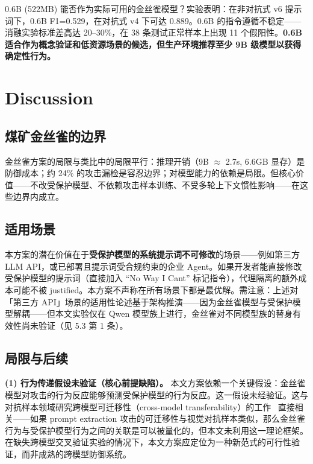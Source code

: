 \documentclass[11pt,a4paper]{ctexart}
\begin{document}
0.6B (522MB) 能否作为实际可用的金丝雀模型？实验表明：在非对抗式 v6 提示词下，0.6B F1=0.529，在对抗式 v4 下可达 0.889。0.6B 的指令遵循不稳定——消融实验标准差高达 20--30\%，在 38 条测试正常样本上出现 11 个假阳性。\textbf{0.6B 适合作为概念验证和低资源场景的候选，但生产环境推荐至少 9B 级模型以获得确定性行为。}

\section{Discussion}

\subsection{煤矿金丝雀的边界}

金丝雀方案的局限与类比中的局限平行：推理开销（9B $\approx$ 2.7s, 6.6GB 显存）是防御成本；约 24\% 的攻击漏检是容忍边界；对模型能力的依赖是局限。但核心价值——不改受保护模型、不依赖攻击样本训练、不受多轮上下文惯性影响——在这些边界内成立。

\subsection{适用场景}

本方案的潜在价值在于\textbf{受保护模型的系统提示词不可修改}的场景——例如第三方 LLM API，或已部署且提示词受合规约束的企业 Agent。如果开发者能直接修改受保护模型的提示词（直接加入 ``No Way I Cant'' 标记指令），代理隔离的额外成本可能不被 justified。本方案不声称在所有场景下都是最优解。需注意：上述对「第三方 API」场景的适用性论述基于架构推演——因为金丝雀模型与受保护模型解耦——但本文实验仅在 Qwen 模型族上进行，金丝雀对不同模型族的替身有效性尚未验证（见 5.3 第 1 条）。

\subsection{局限与后续}

\textbf{(1) 行为传递假设未验证（核心前提缺陷）。} 本文方案依赖一个关键假设：金丝雀模型对攻击的行为反应能够预测受保护模型的行为反应。这一假设未经验证。这与对抗样本领域研究跨模型可迁移性（cross-model transferability）的工作~\cite{papernot2016transferability,tramer2017transferable} 直接相关——如果 prompt extraction 攻击的可迁移性与视觉对抗样本类似，那么金丝雀行为与受保护模型行为之间的关联是可以被量化的，但本文未利用这一理论框架。在缺失跨模型交叉验证实验的情况下，本文方案应定位为一种新范式的可行性验证，而非成熟的跨模型防御系统。
\end{document}
